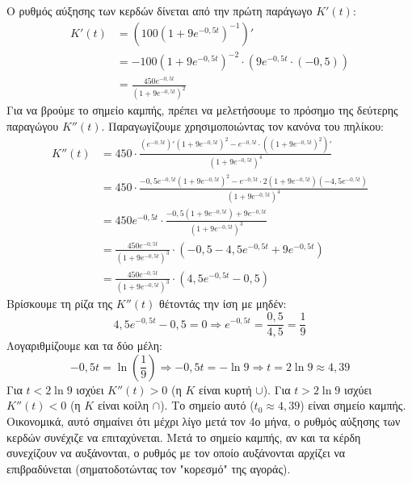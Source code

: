 \lysh
Ο ρυθμός αύξησης των κερδών δίνεται από την πρώτη παράγωγο $K'(t)$:
\begin{align*}
K'(t) &= \left( 100(1 + 9e^{-0{,}5t})^{-1} \right)' \\
&= -100(1 + 9e^{-0{,}5t})^{-2} \cdot (9e^{-0{,}5t} \cdot (-0{,}5)) \\
&= \frac{450e^{-0{,}5t}}{(1 + 9e^{-0{,}5t})^2}
\end{align*}
Για να βρούμε το σημείο καμπής, πρέπει να μελετήσουμε το πρόσημο της δεύτερης παραγώγου $K''(t)$. Παραγωγίζουμε χρησιμοποιώντας τον κανόνα του πηλίκου:
\begin{align*}
K''(t) &= 450 \cdot \frac{(e^{-0{,}5t})'(1 + 9e^{-0{,}5t})^2 - e^{-0{,}5t} \cdot ((1 + 9e^{-0{,}5t})^2)'}{(1 + 9e^{-0{,}5t})^4} \\
&= 450 \cdot \frac{-0{,}5e^{-0{,}5t}(1 + 9e^{-0{,}5t})^2 - e^{-0{,}5t} \cdot 2(1 + 9e^{-0{,}5t})(-4{,}5e^{-0{,}5t})}{(1 + 9e^{-0{,}5t})^4} \\
&= 450e^{-0{,}5t} \cdot \frac{-0{,}5(1 + 9e^{-0{,}5t}) + 9e^{-0{,}5t}}{(1 + 9e^{-0{,}5t})^3} \\
&= \frac{450e^{-0{,}5t}}{(1 + 9e^{-0{,}5t})^3} \cdot (-0{,}5 - 4{,}5e^{-0{,}5t} + 9e^{-0{,}5t}) \\
&= \frac{450e^{-0{,}5t}}{(1 + 9e^{-0{,}5t})^3} \cdot (4{,}5e^{-0{,}5t} - 0{,}5)
\end{align*}
Βρίσκουμε τη ρίζα της $K''(t)$ θέτοντάς την ίση με μηδέν:
\[ 4{,}5e^{-0{,}5t} - 0{,}5 = 0 \Rightarrow e^{-0{,}5t} = \frac{0{,}5}{4{,}5} = \frac{1}{9} \]
Λογαριθμίζουμε και τα δύο μέλη:
\[ -0{,}5t = \ln\left(\frac{1}{9}\right) \Rightarrow -0{,}5t = -\ln 9 \Rightarrow t = 2\ln 9 \approx 4{,}39 \]
Για $t < 2\ln 9$ ισχύει $K''(t) > 0$ (η $K$ είναι κυρτή $\cup$).
Για $t > 2\ln 9$ ισχύει $K''(t) < 0$ (η $K$ είναι κοίλη $\cap$).
Το σημείο αυτό ($t_0 \approx 4{,}39$) είναι σημείο καμπής. Οικονομικά, αυτό σημαίνει ότι μέχρι λίγο μετά τον 4ο μήνα, ο ρυθμός αύξησης των κερδών συνέχιζε να επιταχύνεται. Μετά το σημείο καμπής, αν και τα κέρδη συνεχίζουν να αυξάνονται, ο ρυθμός με τον οποίο αυξάνονται αρχίζει να επιβραδύνεται (σηματοδοτώντας τον "κορεσμό" της αγοράς).

